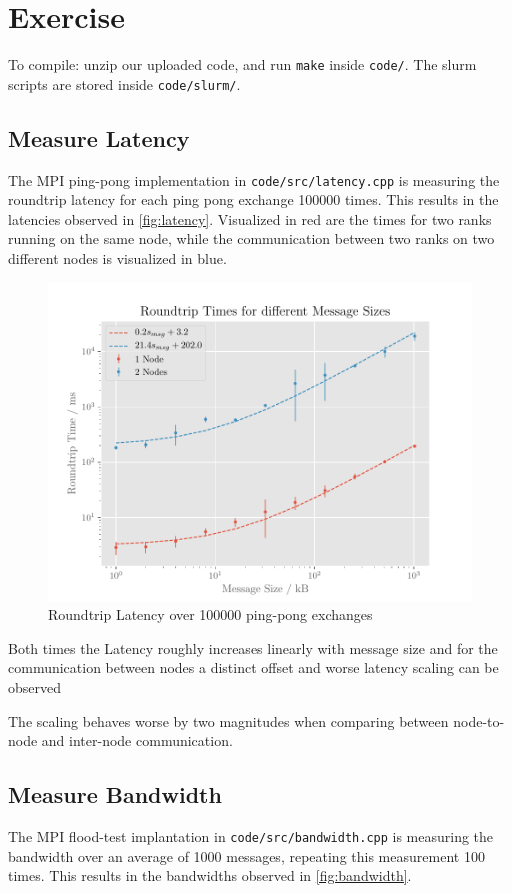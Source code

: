 \documentclass[]{scrartcl}
\newcommand{\exercise}{Exercise \thesection}
\begin{document}
\section*{\exercise}

To compile: unzip our uploaded code, and run \verb|make| inside \verb|code/|.
The slurm scripts are stored inside \verb|code/slurm/|.

\subsection{Measure Latency}
The MPI ping-pong implementation in \verb|code/src/latency.cpp| is measuring the roundtrip latency for each ping pong exchange 100000 times.
This results in the latencies observed in \autoref{fig:latency}.
Visualized in red are the times for two ranks running on the same node, while the communication between two ranks on two different nodes is visualized in blue.

\begin{figure}[ht]
    \centering
    \includegraphics[width=\linewidth]{img/latency}
    \caption{Roundtrip Latency over 100000 ping-pong exchanges}%
    \label{fig:latency}
\end{figure}

Both times the Latency roughly increases linearly with message size and for the communication between nodes a distinct offset and worse latency scaling can be observed

The scaling behaves worse by two magnitudes when comparing between node-to-node and inter-node communication.

\subsection{Measure Bandwidth}
The MPI flood-test implantation in \verb|code/src/bandwidth.cpp| is measuring the bandwidth over an average of 1000 messages, repeating this measurement 100 times.
This results in the bandwidths observed in \autoref{fig:bandwidth}.
\end{document}
